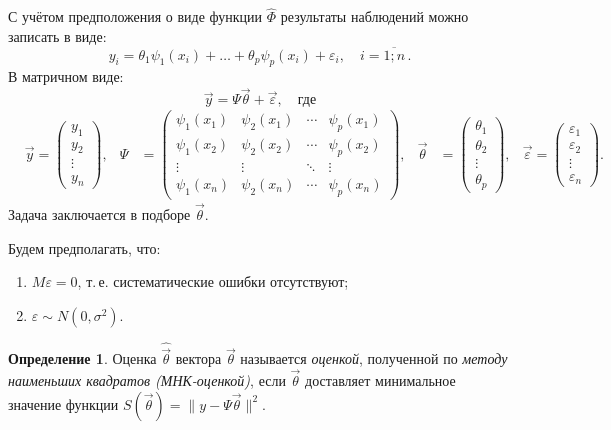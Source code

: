 \documentclass[a4paper, 12pt]{article}
\theoremstyle{definition}
\newtheorem{defn}{Определение}[section]
\begin{document}
С учётом предположения о виде функции $\widehat{\Phi}$ результаты наблюдений можно записать в виде:
\begin{equation}
y_i = \theta_1 \psi_1(x_i) + \dots + \theta_p \psi_p(x_i) + \varepsilon_i, \quad i = \overline{1; n}\,.
\end{equation}
В матричном виде:
\begin{equation}
\vec{y} = \Psi \vec{\theta} + \vec{\varepsilon}, \quad \text{где}
\end{equation}
\begin{align*}
& \vec{y} = \begin{pmatrix} 
y_1    \\ 
y_2    \\ 
\vdots \\ 
y_n 
\end{pmatrix},
& \Psi &= \begin{pmatrix}
\psi_1(x_1) & \psi_2(x_1) & \cdots & \psi_p(x_1) \\
\psi_1(x_2) & \psi_2(x_2) & \cdots & \psi_p(x_2) \\
\vdots      & \vdots      & \ddots & \vdots      \\
\psi_1(x_n) & \psi_2(x_n) & \cdots & \psi_p(x_n)
\end{pmatrix},
& \vec{\theta} &= \begin{pmatrix}
\theta_1 \\
\theta_2 \\ 
\vdots   \\ 
\theta_p
\end{pmatrix},
& \vec{\varepsilon} = \begin{pmatrix} 
\varepsilon_1 \\
\varepsilon_2 \\ 
\vdots        \\ 
\varepsilon_n
\end{pmatrix}.
\end{align*} 
Задача заключается в подборе $\vec{\theta}$.

Будем предполагать, что:
\begin{enumerate}
	\item $M\varepsilon = 0$, т.\,е. систематические ошибки отсутствуют;
	\item $\varepsilon \sim N(0, \sigma^2)$.
\end{enumerate}

\begin{defn}
	Оценка $\hat{\vec{\theta}}$ вектора $\vec{\theta}$ называется \emph{оценкой}, полученной по \emph{методу наименьших квадратов (МНК-оценкой)}, если $\vec{\theta}$ доставляет минимальное значение функции $S(\vec{\theta}) = \|y - \Psi \vec{\theta}\|^2$.
\end{defn}
\end{document}
